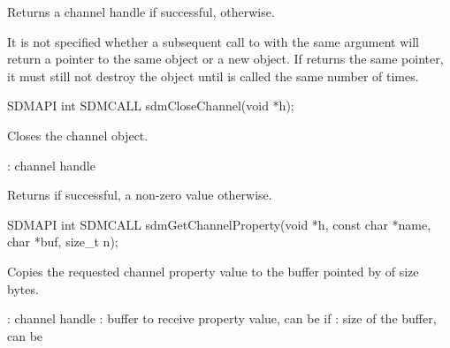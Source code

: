 \documentclass[a4paper,12pt,twoside,extrafontsizes]{memoir}
\begin{document}
\begin{funcret}
	Returns a channel handle if successful,  otherwise.
\end{funcret}

\begin{funcremarks}
	It is not specified whether a subsequent call to  with the same  argument will return a pointer to the same object or a new object. If  returns the same pointer, it must still not destroy the object until  is called the same number of times.
\end{funcremarks}



\begin{cfuncprototype}
SDMAPI int SDMCALL sdmCloseChannel(void *h);
\end{cfuncprototype}

\begin{funcdescr}
	Closes the channel object.
\end{funcdescr}

\begin{funcparams}
	: channel handle
\end{funcparams}

\begin{funcret}
	Returns  if successful, a non-zero value otherwise.
\end{funcret}



\begin{cfuncprototype}
SDMAPI int SDMCALL sdmGetChannelProperty(void *h, const char *name, char *buf, size_t n);
\end{cfuncprototype}

\begin{funcdescr}
	Copies the requested channel property value to the buffer pointed by  of size  bytes.
\end{funcdescr}

\begin{funcparams}
	: channel handle
	: buffer to receive property value, can be  if 
	: size of the buffer, can be 
\end{funcparams}
\end{document}
